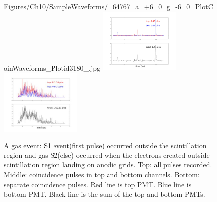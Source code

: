 \begin{center}
\begin{figure}[!htbp]
  {Figures/Ch10/SampleWaveforms/_64767_a_+6_0_g_-6_0_PlotCoinWaveforms_Plotid3180_.jpg}
  \includegraphics[width=0.35\textwidth,clip,trim={0 600 0 0}]
  {Figures/Ch10/SampleWaveforms/_64767_a_+6_0_g_-6_0_PlotCoinWaveforms_Plotid3181_.jpg}
  \includegraphics[width=0.35\textwidth,clip,trim={0 600 0 0}]
  {Figures/Ch10/SampleWaveforms/3182.jpg}
  \caption{A gas event: S1 event(first pulse) occurred outside the scintillation region and gas S2(else) occurred when the electrons created outside scintillation region landing on anodic grids. Top: all pulses recorded. Middle: coincidence pulses in top and bottom channels. Bottom: separate coincidence pulses. Red line is top PMT. Blue line is bottom PMT. Black line is the sum of the top and bottom PMTs. }
  \label{fig: S1 gas S2}
\end{figure}
\end{center}


